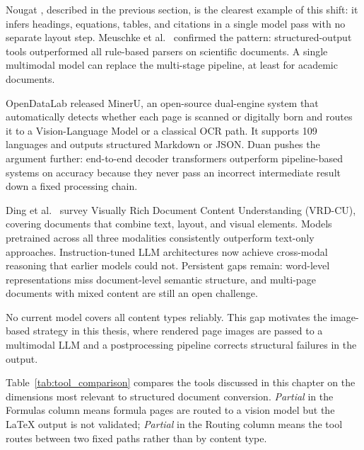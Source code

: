 Nougat \autocite{blecher2023}, described in the previous section, is the clearest
example of this shift: it infers headings, equations, tables, and citations in
a single model pass with no separate layout step. Meuschke et al.\
\autocite{meuschke2023} confirmed the pattern: structured-output tools
outperformed all rule-based parsers on scientific documents. A single
multimodal model can replace the multi-stage pipeline, at least for academic
documents.

OpenDataLab \autocite{mineru_software} released MinerU, an open-source dual-engine
system that automatically detects whether each page is scanned or digitally born
and routes it to a Vision-Language Model or a classical OCR path. It supports
109 languages and outputs structured Markdown or JSON. Duan \autocite{duan2025}
pushes the argument further:
end-to-end decoder transformers outperform pipeline-based systems on accuracy
because they never pass an incorrect intermediate result down a fixed processing
chain.

Ding et al.\ \autocite{ding2026} survey Visually Rich Document Content Understanding
(VRD-CU), covering documents that combine text, layout, and visual elements.
Models pretrained across all three modalities consistently outperform text-only
approaches. Instruction-tuned LLM architectures now achieve cross-modal reasoning
that earlier models could not. Persistent gaps remain: word-level representations
miss document-level semantic structure, and multi-page documents with mixed
content are still an open challenge.

No current model covers all content types reliably. This gap motivates the
image-based strategy in this thesis, where rendered page images are passed to a
multimodal LLM and a postprocessing pipeline corrects structural failures in the
output.

Table~\ref{tab:tool_comparison} compares the tools discussed in this chapter
on the dimensions most relevant to structured document conversion.
\textit{Partial} in the Formulas column means formula pages are routed to a
vision model but the LaTeX output is not validated; \textit{Partial} in the
Routing column means the tool routes between two fixed paths rather than by
content type.

